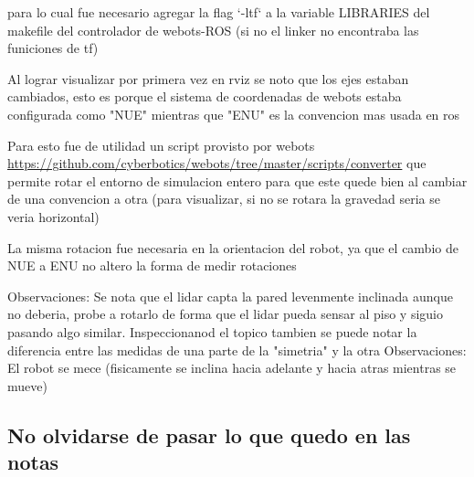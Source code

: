 para lo cual fue necesario agregar la flag `-ltf` a la variable LIBRARIES del makefile del controlador de webots-ROS (si no el linker no encontraba las funiciones de tf)

Al lograr visualizar por primera vez en rviz se noto que los ejes estaban cambiados, esto es porque el sistema de coordenadas de webots estaba configurada como "NUE" mientras que "ENU" es la convencion mas usada en ros

Para esto fue de utilidad un script provisto por webots \url{https://github.com/cyberbotics/webots/tree/master/scripts/converter} que permite rotar el entorno de simulacion entero para que este quede bien al cambiar de una convencion a otra (para visualizar, si no se rotara la gravedad seria se veria horizontal)

La misma rotacion fue necesaria en la orientacion del robot, ya que el cambio de NUE a ENU no altero la forma de medir rotaciones

Observaciones: Se nota que el lidar capta la pared levenmente inclinada aunque no deberia, probe a rotarlo de forma que el lidar pueda sensar al piso y siguio pasando algo similar. Inspeccionanod el topico tambien se puede notar la diferencia entre las medidas de una parte de la "simetria" y la otra
Observaciones: El robot se mece (fisicamente se inclina hacia adelante y hacia atras mientras se mueve)

\subsection{No olvidarse de pasar lo que quedo en las notas}
